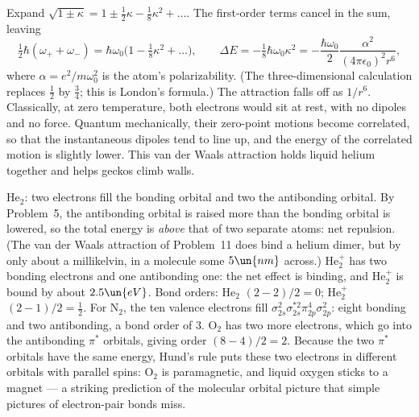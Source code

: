  Expand $\sqrt{1\pm\kappa} = 1\pm\tfrac12\kappa - \tfrac18\kappa^2 + \dots$. The first-order terms cancel in the sum, leaving
\[
  \tfrac12\hbar(\omega_++\omega_-) = \hbar\omega_0\big(1 - \tfrac18\kappa^2+\dots\big),\qquad\Delta E = -\tfrac18\hbar\omega_0\kappa^2 = -\frac{\hbar\omega_0}{2}\frac{\alpha^2}{(4\pi\epsilon_0)^2r^6},
\]
where $\alpha = e^2/m\omega_0^2$ is the atom's polarizability. (The three-dimensional calculation replaces $\tfrac12$ by $\tfrac34$; this is London's formula.) The attraction falls off as $1/r^6$. Classically, at zero temperature, both electrons would sit at rest, with no dipoles and no force. Quantum mechanically, their zero-point motions become correlated, so that the instantaneous dipoles tend to line up, and the energy of the correlated motion is slightly lower. This van der Waals attraction holds liquid helium together and helps geckos climb walls.

 He$_2$: two electrons fill the bonding orbital and two the antibonding orbital. By Problem~5, the antibonding orbital is raised more than the bonding orbital is lowered, so the total energy is \emph{above} that of two separate atoms: net repulsion. (The van der Waals attraction of Problem~11 does bind a helium dimer, but by only about a millikelvin, in a molecule some $5\un{nm}$ across.) He$_2^+$ has two bonding electrons and one antibonding one: the net effect is binding, and He$_2^+$ is bound by about $2.5\un{eV}$. Bond orders: He$_2$ $(2-2)/2 = 0$; He$_2^+$ $(2-1)/2 = \tfrac12$. For N$_2$, the ten valence electrons fill $\sigma_{2s}^2\sigma_{2s}^{*2}\pi_{2p}^4\sigma_{2p}^2$: eight bonding and two antibonding, a bond order of $3$. O$_2$ has two more electrons, which go into the antibonding $\pi^*$ orbitals, giving order $(8-4)/2 = 2$. Because the two $\pi^*$ orbitals have the same energy, Hund's rule puts these two electrons in different orbitals with parallel spins: O$_2$ is paramagnetic, and liquid oxygen sticks to a magnet --- a striking prediction of the molecular orbital picture that simple pictures of electron-pair bonds miss.
